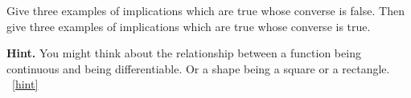 \documentclass{book}
\begin{document}
\setcounter{project}{13}
\addtocounter{project}{-1}
\begin{activity}[]\label{activity-8}
\hypertarget{p-168}{}%
Give three examples of implications which are true whose converse is false.  Then give three examples of implications which are true whose converse is true.%
\par\smallskip%
\noindent\textbf{Hint.}\hypertarget{hint-1}{}\quad%
\hypertarget{p-169}{}%
You might think about the relationship between a function being continuous and being differentiable.  Or a shape being a square or a rectangle.%
~\hfill{\tiny\hyperlink{a-13}{[hint]}\hypertarget{q-13}{}}\end{activity}

\clearpage
\end{document}

